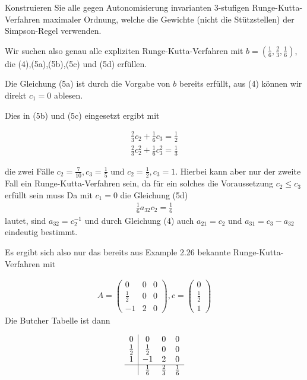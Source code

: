 \begin{exercise}

Konstruieren Sie alle gegen Autonomisierung invarianten $3$-stufigen Runge-Kutta-Verfahren maximaler Ordnung, welche die Gewichte (nicht die Stützstellen) der Simpson-Regel verwenden.

\end{exercise}

\begin{solution}

Wir suchen also genau alle expliziten Runge-Kutta-Verfahren mit $b = (\frac{1}{6},\frac{2}{3},\frac{1}{6})$, die (4),(5a),(5b),(5c) und (5d) erfüllen.

Die Gleichung (5a) ist durch die Vorgabe von $b$ bereits erfüllt, aus (4) können wir direkt $c_{1}=0$ ablesen.

Dies in (5b) und (5c) eingesetzt ergibt mit

\begin{align*}
    \frac{2}{3}c_{2} + \frac{1}{6}c_{3} = \frac{1}{2} \\
    \frac{2}{3}c_{2}^{2} + \frac{1}{6}c_{3}^{2} = \frac{1}{3}
\end{align*}

die zwei Fälle $c_{2}=\frac{7}{10}, c_{3}=\frac{1}{5}$ und $c_{2}=\frac{1}{2}, c_{3}=1$. Hierbei kann aber nur der zweite Fall ein Runge-Kutta-Verfahren sein, da für ein solches die Voraussetzung $c_{2} \leq c_{3}$ erfüllt sein muss
Da mit $c_{1}=0$ die Gleichung (5d)
\begin{align*}
    \frac{1}{6}a_{32}c_{2}=\frac{1}{6}
\end{align*}
lautet, sind $a_{32}=c_{2}^{-1}$ und durch Gleichung (4) auch $a_{21}=c_{2}$ und $a_{31}=c_{3}-a_{32}$ eindeutig bestimmt.

Es ergibt sich also nur das bereits aus Example 2.26 bekannte Runge-Kutta-Verfahren mit

\begin{align*}
    A = \left( \begin{array}{rrr}
         0 & 0 & 0 \\
        \frac{1}{2} & 0 & 0 \\
        -1 & 2 & 0
    \end{array} \right) , c = \begin{pmatrix}
    0 \\ \frac{1}{2} \\ 1
    \end{pmatrix}
\end{align*}
Die Butcher Tabelle ist dann

\begin{align*}
  \begin{array}{c|ccc}
  0 & 0 & 0 & 0 \\
  \frac{1}{2} & \frac{1}{2} & 0 & 0 \\
  1 & -1 & 2 & 0 \\
  \hline
  & \frac{1}{6} & \frac{2}{3} & \frac{1}{6}
  \end{array}
\end{align*}

\end{solution}

